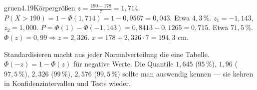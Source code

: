 \begin{loesungkarte}{gruen}{4.19}{Körpergrößen}
$z = \frac{190 - 178}7 = 1{,}714$. $P(X > 190) = 1 - \Phi(1{,}714) = 1 - 0{,}9567 = 0{,}043$. Etwa $4{,}3\,\%$.
$z_1 = -1{,}143$, $z_2 = 1{,}000$. $P = \Phi(1) - \Phi(-1{,}143) = 0{,}8413 - 0{,}1265 = 0{,}715$. Etwa $71{,}5\,\%$.
$\Phi(z) = 0{,}99\Rightarrow z = 2{,}326$. $x = 178 + 2{,}326\cdot7 = 194{,}3$ cm.
\begin{mitnehmen}\kastentext
Standardisieren macht aus jeder Normalverteilung die eine Tabelle. $\Phi(-z) = 1 - \Phi(z)$ für negative Werte. Die Quantile $1{,}645$ ($95\,\%$), $1{,}96$ ($97{,}5\,\%$), $2{,}326$ ($99\,\%$), $2{,}576$ ($99{,}5\,\%$) sollte man auswendig kennen --- sie kehren in Konfidenzintervallen und Tests wieder.
\end{mitnehmen}
\end{loesungkarte}

